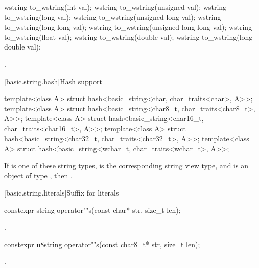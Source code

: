 %
\begin{itemdecl}
wstring to_wstring(int val);
wstring to_wstring(unsigned val);
wstring to_wstring(long val);
wstring to_wstring(unsigned long val);
wstring to_wstring(long long val);
wstring to_wstring(unsigned long long val);
wstring to_wstring(float val);
wstring to_wstring(double val);
wstring to_wstring(long double val);
\end{itemdecl}

\begin{itemdescr}
\pnum
\returns
{}.
\end{itemdescr}

[basic.string.hash]{Hash support}

%
\begin{itemdecl}
template<class A> struct hash<basic_string<char, char_traits<char>, A>>;
template<class A> struct hash<basic_string<char8_t, char_traits<char8_t>, A>>;
template<class A> struct hash<basic_string<char16_t, char_traits<char16_t>, A>>;
template<class A> struct hash<basic_string<char32_t, char_traits<char32_t>, A>>;
template<class A> struct hash<basic_string<wchar_t, char_traits<wchar_t>, A>>;
\end{itemdecl}

\begin{itemdescr}
\pnum
If  is one of these string types,
 is the corresponding string view type, and
 is an object of type ,
then .
\end{itemdescr}

[basic.string.literals]{Suffix for  literals}

%
\begin{itemdecl}
constexpr string operator""s(const char* str, size_t len);
\end{itemdecl}

\begin{itemdescr}
\pnum
\returns
{}.
\end{itemdescr}

%
\begin{itemdecl}
constexpr u8string operator""s(const char8_t* str, size_t len);
\end{itemdecl}
\begin{itemdescr}
\pnum
\returns
{}.
\end{itemdescr}

